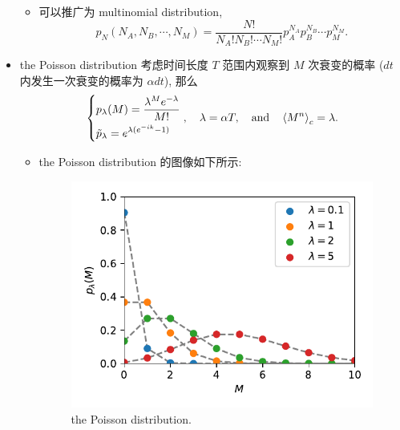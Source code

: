 \begin{itemize}
	\begin{itemize}
		\item 可以推广为 multinomial distribution,
		\begin{equation}
			p_N(N_A, N_B, \cdots, N_M) = \frac{N!}{N_A! N_B! \cdots N_M!} p_A^{N_A} p_B^{N_B} \cdots p_M^{N_M}.
		\end{equation}
	\end{itemize}
	
	\item the Poisson distribution 考虑时间长度 $T$ 范围内观察到 $M$ 次衰变的概率 ($dt$ 内发生一次衰变的概率为 $\alpha dt$), 那么
	\begin{equation}
		\begin{dcases}
			p_\lambda(M) = \frac{\lambda^M e^{- \lambda}}{M!} \\
			\tilde{p}_\lambda = e^{\lambda (e^{- i k} - 1)}
		\end{dcases}, \quad \lambda = \alpha T, \quad \text{and} \quad \braket{M^n}_c = \lambda.
	\end{equation}
	\begin{itemize}
		\item the Poisson distribution 的图像如下所示:
		
		\begin{figure}[H]
			\centering
			\includegraphics[scale=0.8]{figures/the Poisson distribution.pdf}
			\caption{the Poisson distribution.}
		\end{figure}
	\end{itemize}
	

\end{itemize}
